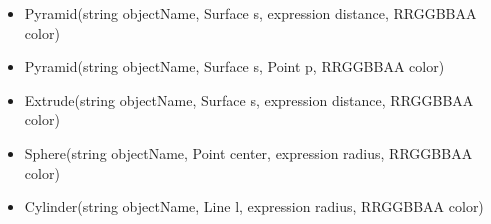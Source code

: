 \begin{itemize}
\item Pyramid(string objectName, Surface s, expression distance, RRGGBBAA color) 

\item Pyramid(string objectName, Surface s, Point p, RRGGBBAA color) 

\item Extrude(string objectName, Surface s, expression distance, RRGGBBAA color) 


\item Sphere(string objectName, Point center, expression radius, RRGGBBAA color)

\item Cylinder(string objectName, Line l, expression radius, RRGGBBAA color)
\end{itemize}